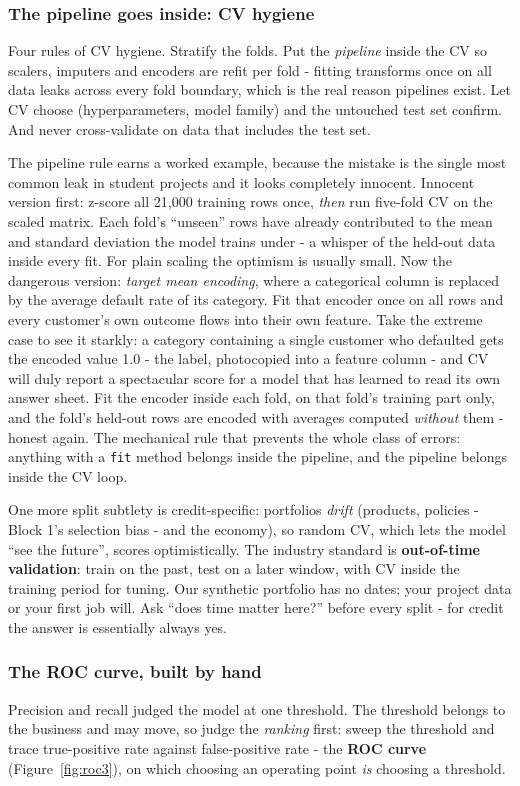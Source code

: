 \documentclass[11pt,a4paper]{article}
\begin{document}
\subsubsection{The pipeline goes inside: CV hygiene}
Four rules of CV hygiene. Stratify the folds. Put the \emph{pipeline}
inside the CV so scalers, imputers and encoders are refit per fold -
fitting transforms once on all data leaks across every fold boundary,
which is the real reason pipelines exist. Let CV choose (hyperparameters,
model family) and the untouched test set confirm. And never cross-validate
on data that includes the test set.

The pipeline rule earns a worked example, because the mistake is the
single most common leak in student projects and it looks completely
innocent. Innocent version first: z-score all 21{,}000 training rows
once, \emph{then} run five-fold CV on the scaled matrix. Each fold's
``unseen'' rows have already contributed to the mean and standard
deviation the model trains under - a whisper of the held-out data
inside every fit. For plain scaling the optimism is usually small.
Now the dangerous version: \emph{target mean encoding}, where a
categorical column is replaced by the average default rate of its
category. Fit that encoder once on all rows and every customer's own
outcome flows into their own feature. Take the extreme case to see
it starkly: a category containing a single customer who defaulted
gets the encoded value 1.0 - the label, photocopied into a feature
column - and CV will duly report a spectacular score for a model that
has learned to read its own answer sheet. Fit the encoder inside each
fold, on that fold's training part only, and the fold's held-out rows
are encoded with averages computed \emph{without} them - honest
again. The mechanical rule that prevents the whole class of errors:
anything with a \texttt{fit} method belongs inside the pipeline, and
the pipeline belongs inside the CV loop.

One more split subtlety is
credit-specific: portfolios \emph{drift} (products, policies - Block 1's
selection bias - and the economy), so random CV, which lets the model
``see the future'', scores optimistically. The industry standard is
\textbf{out-of-time validation}: train on the past, test on a later window,
with CV inside the training period for tuning. Our synthetic portfolio has
no dates; your project data or your first job will. Ask ``does time
matter here?'' before every split - for credit the answer is
essentially always yes.

\subsubsection{The ROC curve, built by hand}
Precision and recall judged the model at one threshold. The threshold
belongs to the business and may move, so judge the \emph{ranking} first:
sweep the threshold and trace true-positive rate against false-positive
rate - the \textbf{ROC curve} (Figure~\ref{fig:roc3}), on which choosing
an operating point \emph{is} choosing a threshold.
\end{document}
